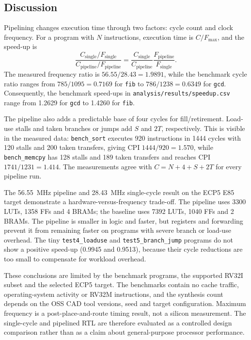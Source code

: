 \subsection{Discussion}
Pipelining changes execution time through two factors: cycle count and clock
frequency. For a program with $N$ instructions, execution time is
$C/F_{\max}$, and the speed-up is
\[
\frac{C_{\mathrm{single}}/F_{\mathrm{single}}}
     {C_{\mathrm{pipeline}}/F_{\mathrm{pipeline}}}
= \frac{C_{\mathrm{single}}}{C_{\mathrm{pipeline}}}
  \frac{F_{\mathrm{pipeline}}}{F_{\mathrm{single}}}.
\]
The measured frequency ratio is $56.55/28.43=1.9891$, while the benchmark cycle
ratio ranges from $785/1095=0.7169$ for \texttt{fib} to $786/1238=0.6349$ for
\texttt{gcd}. Consequently, the benchmark speed-ups in
\texttt{analysis/results/speedup.csv} range from 1.2629 for \texttt{gcd} to
1.4260 for \texttt{fib}.

The pipeline also adds a predictable base of four cycles for fill/retirement.
Load-use stalls and taken branches or jumps add $S$ and $2T$, respectively.
This is visible in the measured data: \texttt{bench\_sort} executes 920
instructions in 1444 cycles with 120 stalls and 200 taken transfers, giving
CPI $1444/920=1.570$, while \texttt{bench\_memcpy} has 128 stalls and 189 taken
transfers and reaches CPI $1741/1231=1.414$. The measurements agree with
$C=N+4+S+2T$ for every pipeline run.

The 56.55~MHz pipeline and 28.43~MHz single-cycle result on the ECP5 E85 target
demonstrate a hardware-versus-frequency trade-off. The pipeline uses 3300 LUTs,
1358 FFs and 4 BRAMs; the baseline uses 7392 LUTs, 1040 FFs and 2 BRAMs. The
pipeline is smaller in logic and faster, but registers and forwarding prevent
it from remaining faster on programs with severe branch or load-use overhead.
The tiny \texttt{test4\_loaduse} and \texttt{test5\_branch\_jump} programs do
not show a positive speed-up (0.9945 and 0.9513), because their cycle reductions
are too small to compensate for workload overhead.

These conclusions are limited by the benchmark programs, the supported RV32I
subset and the selected ECP5 target. The benchmarks contain no cache traffic,
operating-system activity or RV32M instructions, and the synthesis count depends
on the OSS CAD tool versions, seed and target configuration. Maximum frequency
is a post-place-and-route timing result, not a silicon measurement. The
single-cycle and pipelined RTL are therefore evaluated as a controlled design
comparison rather than as a claim about general-purpose processor performance.
